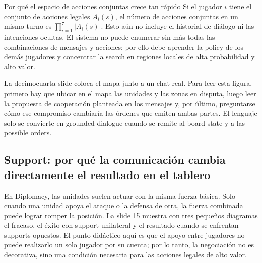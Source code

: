 

\begin{knowledgebox}{Por qué el espacio de acciones conjuntas crece tan rápido}
Si el jugador $i$ tiene el conjunto de acciones legales $A_i(s)$, el número de acciones conjuntas en un mismo turno es $\prod_{i=1}^{7}|A_i(s)|$. Esto aún no incluye el historial de diálogo ni las intenciones ocultas. El sistema no puede enumerar sin más todas las combinaciones de mensajes y acciones; por ello debe aprender la policy de los demás jugadores y concentrar la search en regiones locales de alta probabilidad y alto valor.
\end{knowledgebox}

La decimocuarta slide coloca el mapa junto a un chat real. Para leer esta figura, primero hay que ubicar en el mapa las unidades y las zonas en disputa, luego leer la propuesta de cooperación planteada en los mensajes y, por último, preguntarse cómo ese compromiso cambiaría las órdenes que emiten ambas partes. El lenguaje solo se convierte en grounded dialogue cuando se remite al board state y a las possible orders.


\subsection{Support: por qué la comunicación cambia directamente el resultado en el tablero}

En Diplomacy, las unidades suelen actuar con la misma fuerza básica. Solo cuando una unidad apoya el ataque o la defensa de otra, la fuerza combinada puede lograr romper la posición. La slide 15 muestra con tres pequeños diagramas el fracaso, el éxito con support unilateral y el resultado cuando se enfrentan supports opuestos. El punto didáctico aquí es que el apoyo entre jugadores no puede realizarlo un solo jugador por su cuenta; por lo tanto, la negociación no es decorativa, sino una condición necesaria para las acciones legales de alto valor.

